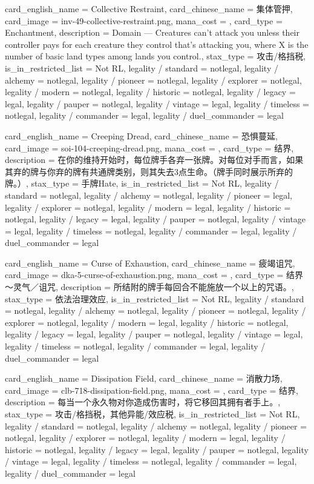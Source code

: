 \documentclass[lang = cn, color = black, 10pt]{AllThatStax}
\begin{document}
\card
{
	card_english_name = {Collective Restraint},
	card_chinese_name = {集体管押},
	card_image = inv-49-collective-restraint.png,
	mana_cost = ,
	card_type = Enchantment,
	description = {Domain — Creatures can't attack you unless their controller pays  for each creature they control that's attacking you, where X is the number of basic land types among lands you control.},
	stax_type = 攻击/格挡税,
	is_in_restricted_list = Not RL,
	legality / standard = notlegal,
	legality / alchemy = notlegal,
	legality / pioneer = notlegal,
	legality / explorer = notlegal,
	legality / modern = notlegal,
	legality / historic = notlegal,
	legality / legacy = legal,
	legality / pauper = notlegal,
	legality / vintage = legal,
	legality / timeless = notlegal,
	legality / commander = legal,
	legality / duel_commander = legal
}

\card
{
	card_english_name = {Creeping Dread},
	card_chinese_name = {恐惧蔓延},
	card_image = soi-104-creeping-dread.png,
	mana_cost = ,
	card_type = 结界,
	description = {在你的维持开始时，每位牌手各弃一张牌。对每位对手而言，如果其弃的牌与你弃的牌有共通牌类别，则其失去3点生命。（牌手同时展示所弃的牌。）},
	stax_type = 手牌Hate,
	is_in_restricted_list = Not RL,
	legality / standard = notlegal,
	legality / alchemy = notlegal,
	legality / pioneer = legal,
	legality / explorer = notlegal,
	legality / modern = legal,
	legality / historic = notlegal,
	legality / legacy = legal,
	legality / pauper = notlegal,
	legality / vintage = legal,
	legality / timeless = notlegal,
	legality / commander = legal,
	legality / duel_commander = legal
}

\card
{
	card_english_name = {Curse of Exhaustion},
	card_chinese_name = {疲竭诅咒},
	card_image = dka-5-curse-of-exhaustion.png,
	mana_cost = ,
	card_type = 结界～灵气／诅咒,
	description = {所结附的牌手每回合不能施放一个以上的咒语。},
	stax_type = 依法治理效应,
	is_in_restricted_list = Not RL,
	legality / standard = notlegal,
	legality / alchemy = notlegal,
	legality / pioneer = notlegal,
	legality / explorer = notlegal,
	legality / modern = legal,
	legality / historic = notlegal,
	legality / legacy = legal,
	legality / pauper = notlegal,
	legality / vintage = legal,
	legality / timeless = notlegal,
	legality / commander = legal,
	legality / duel_commander = legal
}

\card
{
	card_english_name = {Dissipation Field},
	card_chinese_name = {消散力场},
	card_image = clb-718-dissipation-field.png,
	mana_cost = ,
	card_type = 结界,
	description = {每当一个永久物对你造成伤害时，将它移回其拥有者手上。},
	stax_type = 攻击/格挡税，其他异能/效应税,
	is_in_restricted_list = Not RL,
	legality / standard = notlegal,
	legality / alchemy = notlegal,
	legality / pioneer = notlegal,
	legality / explorer = notlegal,
	legality / modern = legal,
	legality / historic = notlegal,
	legality / legacy = legal,
	legality / pauper = notlegal,
	legality / vintage = legal,
	legality / timeless = notlegal,
	legality / commander = legal,
	legality / duel_commander = legal
}
\end{document}
